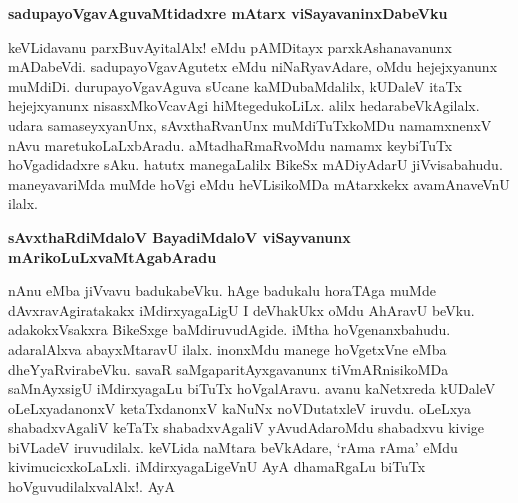 {\bf sadupayoVgavAguvaMtidadxre mAtarx viSayavaninxDabeVku}

keVLidavanu parxBuvAyitalAlx! eMdu pAMDitayx parxkAshanavanunx mADabeVdi. sadupayoVgavAgutetx eMdu niNaRyavAdare, oMdu hejejxyanunx muMdiDi. durupayoVgavAguva sUcane kaMDubaMdalilx, kUDaleV itaTx hejejxyanunx nisasxMkoVcavAgi hiMtegedukoLiLx. alilx hedarabeVkAgilalx. udara samaseyxyanUnx, sAvxthaRvanUnx muMdiTuTxkoMDu namamxnenxV nAvu maretukoLaLxbAradu. aMtadhaRmaRvoMdu namamx keybiTuTx hoVgadidadxre sAku. hatutx manegaLalilx BikeSx mADiyAdarU jiVvisabahudu. maneyavariMda muMde hoVgi eMdu heVLisikoMDa mAtarxkekx avamAnaveVnU ilalx.

{\bf sAvxthaRdiMdaloV BayadiMdaloV viSayvanunx mArikoLuLxvaMtAgabAradu}

nAnu eMba jiVvavu badukabeVku. hAge badukalu horaTAga muMde dAvxravAgiratakakx iMdirxyagaLigU I deVhakUkx oMdu AhAravU beVku. adakokxVsakxra BikeSxge baMdiruvudAgide. iMtha hoVgenanxbahudu. adaralAlxva abayxMtaravU ilalx. inonxMdu manege hoVgetxVne eMba dheYyaRvirabeVku. savaR saMgaparitAyxgavanunx tiVmARnisikoMDa saMnAyxsigU iMdirxyagaLu biTuTx hoVgalAravu. avanu kaNetxreda kUDaleV oLeLxyadanonxV ketaTxdanonxV kaNuNx noVDutatxleV iruvdu. oLeLxya shabadxvAgaliV keTaTx shabadxvAgaliV yAvudAdaroMdu shabadxvu kivige biVLadeV iruvudilalx. keVLida naMtara beVkAdare, `rAma rAma' eMdu kivimucicxkoLaLxli. iMdirxyagaLigeVnU AyA dhamaRgaLu biTuTx hoVguvudilalxvalAlx!. AyA




	













